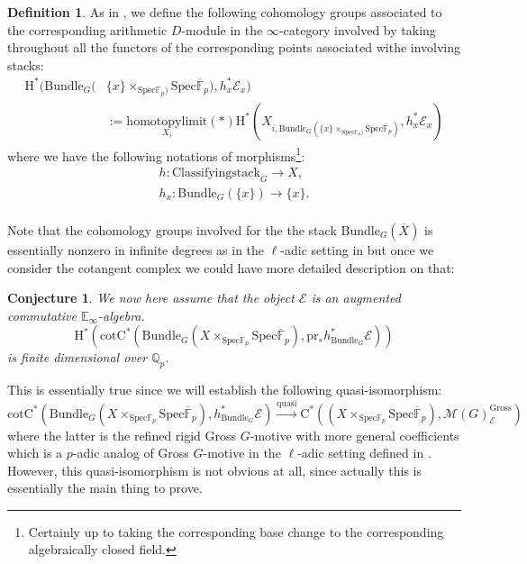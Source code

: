 \documentclass[11pt]{book}
\newtheorem{conjecture}[theorem]{Conjecture}
\theoremstyle{definition}
\newtheorem{definition}[theorem]{Definition}
\numberwithin{equation}{section}
\begin{document}
\begin{definition}
As in \cite[Construction 3.2.5.1]{GL1}, we define the following cohomology groups associated to the corresponding arithmetic $D$-module in the $\infty$-category involved by taking throughout all the functors of the corresponding points associated withe involving stacks:
\begin{align}
\mathrm{H}^*(\mathrm{Bundle}_G(&\{x\}\times_{\mathrm{Spec}\mathbb{F}_p)} \mathrm{Spec}\overline{\mathbb{F}}_p),h_x^*{\mathcal{E}}_x)\\
&:=\underset{X_i}{\mathrm{homotopylimit}}(*)\mathrm{H}^*(X_{i,\mathrm{Bundle}_G(\{x\}\times_{\mathrm{Spec}\mathbb{F}_p)} \mathrm{Spec}\overline{\mathbb{F}}_p)},h_x^*{\mathcal{E}}_x)
\end{align}
where we have the following notations of morphisms\footnote{Certainly up to taking the corresponding base change to the corresponding algebraically closed field.}:
\begin{align}
h:\mathrm{Classifyingstack}_G\rightarrow X,\\
h_x:\mathrm{Bundle}_G(\{x\})\rightarrow \{x\}.\\	
\end{align}
	
\end{definition}







Note that the cohomology groups involved for the the stack $\mathrm{Bundle}_G(\overline{X})$ is essentially nonzero in infinite degrees as in the $\ell$-adic setting in \cite{GL1} but once we consider the cotangent complex we could have more detailed description on that:

\begin{conjecture}
We now here assume that the object $\mathcal{E}$ is an augmented commutative $\mathbb{E}_\infty$-algebra.
\begin{displaymath}
\mathrm{H}^{*}(\mathrm{cot}\mathrm{C}^*(\mathrm{Bundle}_G(X\times_{\mathrm{Spec}\mathbb{F}_p} \mathrm{Spec}\overline{\mathbb{F}}_p),\mathrm{pr}_*h_{\mathrm{Bundle}_G}^*\mathcal{E}))
\end{displaymath}
is finite dimensional over $\mathbb{Q}_p$.
\end{conjecture}


This is essentially true since we will establish the following quasi-isomorphism:
\begin{displaymath}
\mathrm{cot}\mathrm{C}^*(\mathrm{Bundle}_G(X\times_{\mathrm{Spec}\mathbb{F}_p} \mathrm{Spec}\overline{\mathbb{F}}_p),h_{\mathrm{Bundle}_G}^*\mathcal{E})\overset{\mathrm{quasi}}{\longrightarrow} \mathrm{C}^*((X\times_{\mathrm{Spec}\mathbb{F}_p} \mathrm{Spec}\overline{\mathbb{F}}_p),\mathcal{M}(G)^\mathrm{Gross}_\mathcal{E})
\end{displaymath}
where the latter is the refined rigid Gross $G$-motive with more general coefficients which is a $p$-adic analog of Gross $G$-motive in the $\ell$-adic setting defined in \cite{Gro1}. However, this quasi-isomorphism is not obvious at all, since actually this is essentially the main thing to prove.
\end{document}
